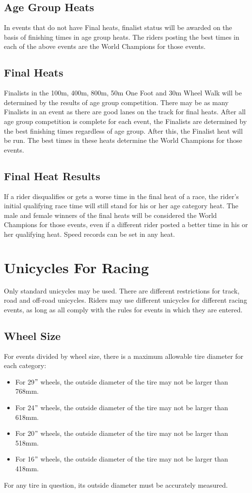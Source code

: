 \subsection{Age Group Heats}
In events that do not have Final heats, finalist status will be awarded on the basis of finishing times in age group heats.
The riders posting the best times in each of the above events are the World Champions for those events.

\subsection{Final Heats}
Finalists in the 100m, 400m, 800m, 50m One Foot and 30m Wheel Walk will be determined by the results of age group competition.
There may be as many Finalists in an event as there are good lanes on the track for final heats.
After all age group competition is complete for each event, the Finalists are determined by the best finishing times regardless of age group.
After this, the Finalist heat will be run.
The best times in these heats determine the World Champions for those events.

\subsection{Final Heat Results}
If a rider disqualifies or gets a worse time in the final heat of a race, the rider's initial qualifying race time will still stand for his or her age category heat.
The male and female winners of the final heats will be considered the World Champions for those events, even if a different rider posted a better time in his or her qualifying heat.
Speed records can be set in any heat.

\section{Unicycles For Racing}
Only standard unicycles may be used.
There are different restrictions for track, road and off-road unicycles.
Riders may use different unicycles for different racing events, as long as all comply with the rules for events in which they are entered.

\subsection{Wheel Size}
For events divided by wheel size, there is a maximum allowable tire diameter for each category: 
\begin{itemize}
\item For 29$"$ wheels, the outside diameter of the tire may not be larger than 768mm.
\item For 24$"$ wheels, the outside diameter of the tire may not be larger than 618mm.
\item For 20$"$ wheels, the outside diameter of the tire may not be larger than 518mm.
\item For 16$"$ wheels, the outside diameter of the tire may not be larger than 418mm.
\end{itemize}
For any tire in question, its outside diameter must be accurately measured.

